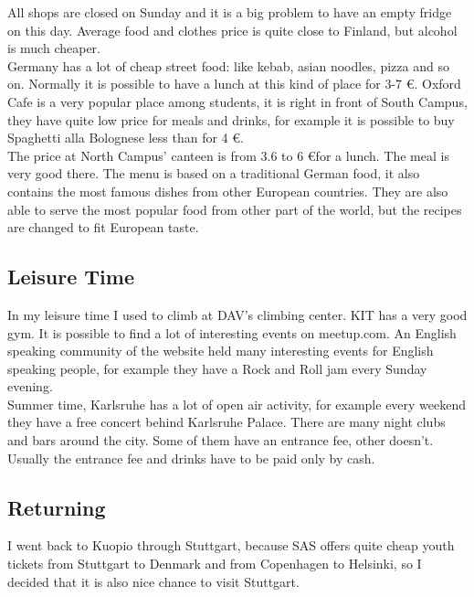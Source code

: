 \documentclass[english]{article}
\begin{document}
All shops are closed on Sunday and it is a big problem to have an empty fridge on this day. Average food and clothes price is quite close to Finland, but alcohol is much cheaper.\\

Germany has a lot of cheap street food: like kebab, asian noodles, pizza and so on. Normally it is possible to have a lunch at this kind of place for 3-7 \euro. Oxford Cafe is a very popular place among students, it is right in front of South Campus, they have quite low price for meals and drinks, for example it is possible to buy Spaghetti alla Bolognese less than for 4 \euro.\\

The price at North Campus’ canteen is from 3.6 to 6 \euro  for a lunch. The meal is very good there. The menu is based on a traditional German food, it also contains the most famous dishes from other European countries. They are also able to serve the most popular food from other part of the world, but the recipes are changed to fit European taste.

\subsection{Leisure Time}

In my leisure time I used to climb at DAV's climbing center. KIT has a very good gym. It is possible to find a lot of interesting events on meetup.com. An English speaking community of the website held many interesting events for English speaking people, for example they have a Rock and Roll jam every Sunday evening. \\

Summer time, Karlsruhe has a lot of open air activity, for example every weekend they have a free concert behind Karlsruhe Palace. There are many night clubs and bars around the city. Some of them have an entrance fee, other doesn't. Usually the entrance fee and drinks have to be paid only by cash. \\

\subsection{Returning}

I went back to Kuopio through Stuttgart, because SAS offers quite cheap youth tickets from Stuttgart to Denmark and from Copenhagen to Helsinki, so I decided that it is also nice chance to visit Stuttgart. \\
\end{document}
